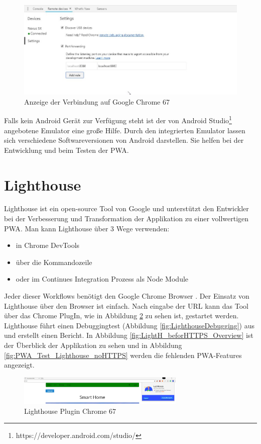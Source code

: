 \begin{figure}[h]
	\centering
	\includegraphics[width=14cm]{BilderAllgemein/DevToolsChrome}\medskip
	\caption{Anzeige der Verbindung auf Google Chrome 67}
	\label{fig:DevToolsChrome}
\end{figure}
\newpage
Falls kein Android Gerät zur Verfügung steht ist der von Android Studio\footnote{https://developer.android.com/studio/} angebotene Emulator eine große Hilfe. Durch den integrierten Emulator lassen sich verschiedene Softwareversionen von Android darstellen. Sie helfen bei der Entwicklung und beim Testen der \acs{PWA}.

\section{Lighthouse}
Lighthouse ist ein open-source Tool von Google und unterstützt den Entwickler bei der Verbesserung und Transformation der Applikation zu einer vollwertigen \acs{PWA}. Man kann Lighthouse über 3 Wege verwenden:
\begin{itemize}
    \item  in Chrome DevTools
	\item  über die Kommandozeile
	\item  oder im Continues Integration Prozess als Node Module
\end{itemize}
Jeder dieser Workflows benötigt den Google Chrome Browser \cite{Lighthouse}.
Der Einsatz von Lighthouse über den Browser ist einfach. Nach eingabe der URL kann das Tool über das Chrome PlugIn, wie in Abbildung \ref{fig:LighthousePlugIN} zu sehen ist, gestartet werden. Lighthouse führt einen Debuggingtest (Abbildung \ref{fig:LighthouseDebugging}) aus und erstellt einen Bericht. In Abbildung \ref{fig:LightH_beforHTTPS_Overview} ist der Überblick der Applikation zu sehen und in Abbildung \ref{fig:PWA_Test_Lighthouse_noHTTPS} werden die fehlenden PWA-Features angezeigt.

\begin{figure}[h]
	\centering
	\includegraphics[width=8cm]{BilderAllgemein/Test/LighthousePlugIN}\medskip
	\caption{Lighthouse Plugin Chrome 67 }
	\label{fig:LighthousePlugIN}
\end{figure}

